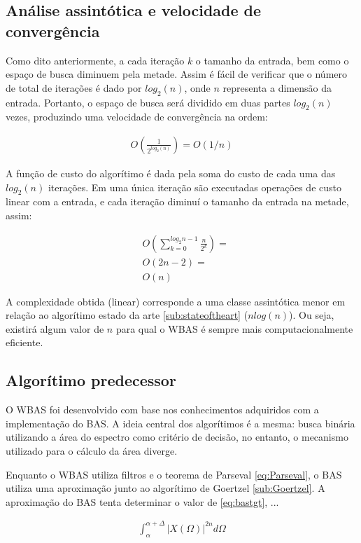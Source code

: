 \subsection{Análise assintótica e velocidade de convergência}

Como dito anteriormente, a cada iteração $k$ o tamanho da entrada, bem como o espaço de busca diminuem pela metade. Assim é fácil de verificar que o número de total de iterações é dado por $log_2(n)$, onde $n$ representa a dimensão da entrada. Portanto, o espaço de busca será dividido em duas partes $log_2(n)$ vezes, produzindo uma velocidade de convergência na ordem:

\begin{align*}
O(\frac{1}{2^{log_2(n)}}) = O(1/n)
\end{align*}

A função de custo do algorítimo é dada pela soma do custo de cada uma das $log_2(n)$ iterações. Em uma única iteração são executadas operações de custo linear com a entrada, e cada iteração diminuí o tamanho da entrada na metade, assim:

\begin{align*}
&O(\sum^{log_2{n}-1}_{k=0} \frac{n}{2^k}) =\\
&O(2n - 2) = \\
&O(n)
\end{align*}

A complexidade obtida (linear) corresponde a uma classe assintótica menor em relação ao algorítimo estado da arte \ref{sub:stateoftheart} ($nlog(n)$). Ou seja, existirá algum valor de $n$ para qual o \ac{WBAS} é sempre mais computacionalmente eficiente.

\subsection{Algorítimo predecessor}

O \ac{WBAS} foi desenvolvido com base nos conhecimentos adquiridos com a implementação do \ac{BAS}. A ideia central dos algorítimos é a mesma: busca binária utilizando a área do espectro como critério de decisão, no entanto, o mecanismo utilizado para o cálculo da área diverge.

Enquanto o \ac{WBAS} utiliza filtros e o teorema de Parseval \eqref{eq:Parseval}, o \ac{BAS} utiliza uma aproximação junto ao algorítimo de Goertzel \ref{sub:Goertzel}. A aproximação do \ac{BAS} tenta determinar o valor de \eqref{eq:bastgt}, ...

\begin{align}
    \label{eq:bastgt}
    \int_{\alpha}^{\alpha + \Delta} \lvert X(\Omega) \rvert^{2n} d\Omega
\end{align}

